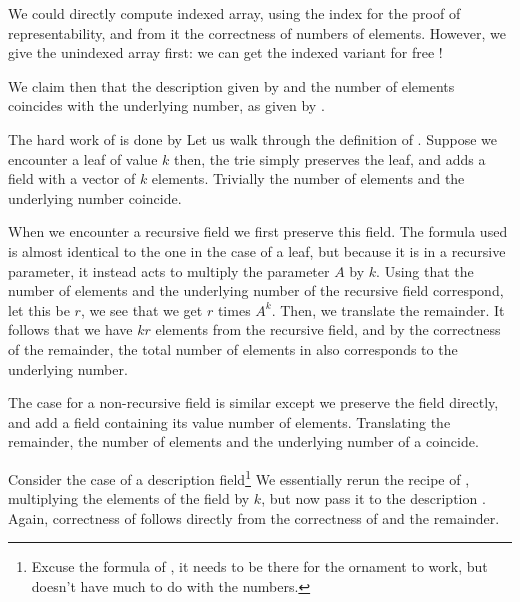 We could directly compute indexed array, using the index for the proof of representability, and from it the correctness of numbers of elements. However, we give the unindexed array first: we can get the indexed variant for free \cite{algorn}!

\begin{conjecture}
    We claim then that the description given by
    and the number of elements coincides with the underlying number, as given by .
\end{conjecture}
The hard work of  is done by
Let us walk through the definition of . Suppose we encounter a leaf of value $k$
then, the trie simply preserves the leaf, and adds a field with a vector of $k$ elements. Trivially the number of elements and the underlying number coincide.

When we encounter a recursive field
we first preserve this field. The formula used is almost identical to the one in the case of a leaf, but because it is in a recursive parameter, it instead acts to multiply the parameter $A$ by $k$. Using that the number of elements and the underlying number of the recursive field correspond, let this be $r$, we see that we get $r$ times $A^k$. Then, we translate the remainder. It follows that we have $kr$ elements from the recursive field, and by the correctness of the remainder, the total number of elements in  also corresponds to the underlying number.

The case for a non-recursive field is similar
except we preserve the field directly, and add a field containing its value number of elements. Translating the remainder, the number of elements and the underlying number of a  coincide.

Consider the case of a description field\footnote{Excuse the formula of , it needs to be there for the ornament to work, but doesn't have much to do with the numbers.}
We essentially rerun the recipe of , multiplying the elements of the field by $k$, but now pass it to the description . Again, correctness of  follows directly from the correctness of  and the remainder.


